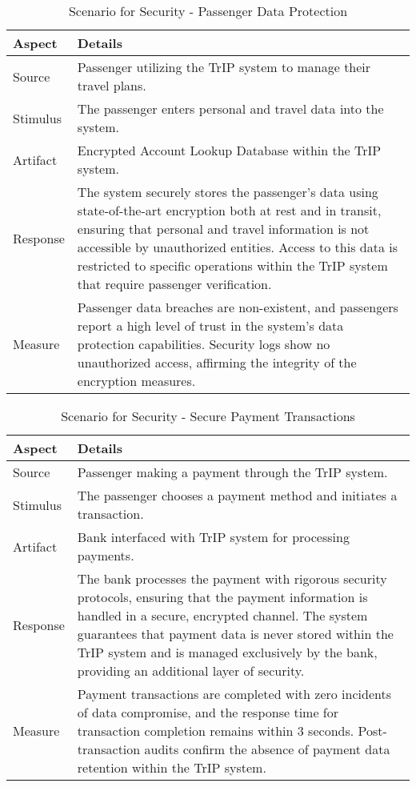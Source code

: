 \begin{table}[H]
    \centering
    \begin{tabularx}{\textwidth}{@{} lX @{}}
    \toprule
    \textbf{Aspect} & \textbf{Details} \\
    \midrule
    Source & Passenger utilizing the TrIP system to manage their travel plans. \\
    Stimulus & The passenger enters personal and travel data into the system. \\
    Artifact & Encrypted Account Lookup Database within the TrIP system. \\
    Response & The system securely stores the passenger's data using state-of-the-art encryption both at rest and in transit, ensuring that personal and travel information is not accessible by unauthorized entities. Access to this data is restricted to specific operations within the TrIP system that require passenger verification. \\
    Measure & Passenger data breaches are non-existent, and passengers report a high level of trust in the system's data protection capabilities. Security logs show no unauthorized access, affirming the integrity of the encryption measures. \\
    \bottomrule
    \end{tabularx}
    \caption{Scenario for Security - Passenger Data Protection}
    \label{table:passenger_data_security}
\end{table}


\begin{table}[H]
    \centering
    \begin{tabularx}{\textwidth}{@{} lX @{}}
    \toprule
    \textbf{Aspect} & \textbf{Details} \\
    \midrule
    Source & Passenger making a payment through the TrIP system. \\
    Stimulus & The passenger chooses a payment method and initiates a transaction. \\
    Artifact & Bank interfaced with TrIP system for processing payments. \\
    Response & The bank processes the payment with rigorous security protocols, ensuring that the payment information is handled in a secure, encrypted channel. The system guarantees that payment data is never stored within the TrIP system and is managed exclusively by the bank, providing an additional layer of security. \\
    Measure & Payment transactions are completed with zero incidents of data compromise, and the response time for transaction completion remains within 3 seconds. Post-transaction audits confirm the absence of payment data retention within the TrIP system. \\
    \bottomrule
    \end{tabularx}
    \caption{Scenario for Security - Secure Payment Transactions}
    \label{table:payment_transaction_security}
\end{table}

